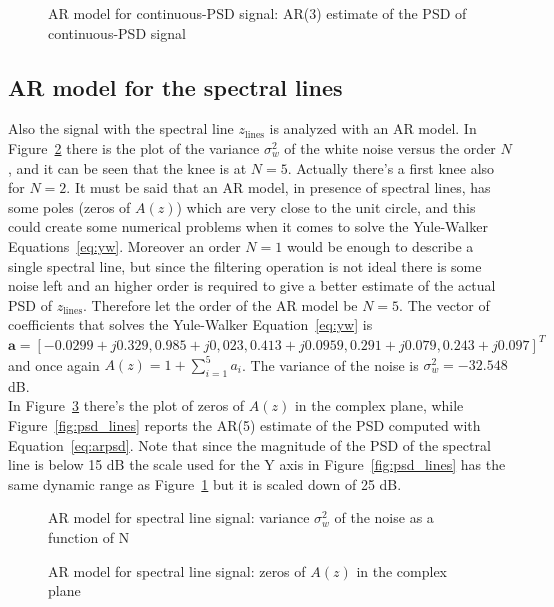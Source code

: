 \documentclass[10pt]{article}
\numberwithin{equation}{section}
\begin{document}
\begin{figure}[h!]

  \caption{AR model for continuous-PSD signal: AR(3) estimate of the PSD of continuous-PSD signal}
  \label{fig:psd_cont}
\end{figure}


\subsection*{AR model for the spectral lines}
Also the signal with the spectral line $z_{\text{lines}}$ is analyzed with an AR model.
In Figure~\ref{fig:ar_lines_sigma} there is the plot of the variance $\sigma_w^2$ of the white noise versus the order $N$, and it can be seen that the knee is at $N=5$. Actually there's a first knee also for $N=2$. It must be said that an AR model, in presence of spectral lines, has some poles (zeros of $A(z)$) which are very close to the unit circle, and this could create some numerical problems when it comes to solve the Yule-Walker Equations~\ref{eq:yw}. Moreover an order $N=1$ would be enough to describe a single spectral line, but since the filtering operation is not ideal there is some noise left and an higher order is required to give a better estimate of the actual PSD of $z_{\text{lines}}$.
Therefore let the order of the AR model be $N=5$. The vector of coefficients that solves the Yule-Walker Equation~\ref{eq:yw} is $\mathbf{a} = [-0.0299 + j0.329, 0.985 + j0,023, 0.413 + j0.0959, 0.291 + j0.079, 0.243 + j0.097]^T$ and once again $A(z) = 1 + \sum_{i=1}^5a_i$. The variance of the noise is $\sigma_w^2 = -32.548$ dB. \\ %
In Figure~\ref{fig:zpl_lines} there's the plot of zeros of $A(z)$ in the complex plane, while Figure~\ref{fig:psd_lines} reports the AR(5) estimate of the PSD computed with Equation~\ref{eq:arpsd}. Note that since the magnitude of the PSD of the spectral line is below 15 dB the scale used for the Y axis in Figure~\ref{fig:psd_lines} has the same dynamic range as Figure~\ref{fig:psd_cont} but it is scaled down of 25 dB.


\begin{figure}[h!]

  \caption{AR model for spectral line signal: variance $\sigma_w^2$ of the noise as a function of N}
  \label{fig:ar_lines_sigma}
\end{figure}

\begin{figure}[h!]

  \caption{AR model for spectral line signal: zeros of $A(z)$ in the complex plane}
  \label{fig:zpl_lines}
\end{figure}
\end{document}
